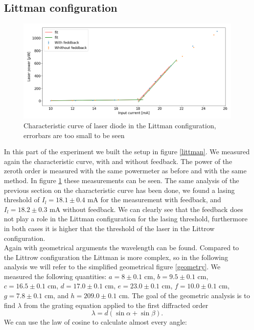 \documentclass[a4paper,10pt]{article}
\begin{document}
\subsection{Littman configuration}
\begin{figure}[H]
\centering
\includegraphics[width=\textwidth]{curvelittman.png}
\caption{Characteristic curve of laser diode in the Littman configuration, errorbars are too small to be seen}\label{littmancurve}
\end{figure}
In this part of the experiment we built the setup in figure \ref{littman}. We measured again the characteristic curve, with and without feedback. The power of the zeroth order is measured with the same powermeter as before and with the same method. In figure \ref{littmancurve} these measurements can be seen. The same analysis of the previous section on the characteristic curve has been done, we found a lasing threshold of $I_l =18.1\pm 0.4$ mA for the measurement with feedback, and $I_l = 18.2 \pm 0.3$ mA without feedback. We can clearly see that the feedback does not play a role in the Littman configuration for the lasing threshold, furthermore in both cases it is higher that the threshold of the laser in the Littrow configuration.\\
Again with geometrical arguments the wavelength can be found. Compared to the Littrow configuration the Littman is more complex, so in the following analysis we will refer to the simplified geometrical figure \ref{geometry}. We measured the following quantities: $a = 8\pm0.1$ cm, $b= 9.5\pm 0.1$ cm, $c = 16.5\pm0.1$ cm, $d = 17.0\pm0.1$ cm, $e = 23.0\pm0.1$ cm, $f = 10.0\pm0.1$ cm, $g = 7.8\pm0.1$ cm, and $h = 209.0\pm0.1$ cm. The goal of the geometric analysis is to find $\lambda$ from the grating equation applied to the first diffracted order
\begin{equation}\lambda = d(\sin\alpha + \sin\beta).\end{equation}
We can use the law of cosine to calculate almost every angle:
\end{document}
